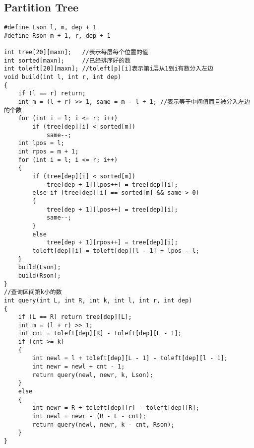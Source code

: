 \documentclass[twoside]{article}
\begin{document}
\subsection{Partition Tree}
\begin{lstlisting}
#define Lson l, m, dep + 1
#define Rson m + 1, r, dep + 1

int tree[20][maxn];   //表示每层每个位置的值
int sorted[maxn];     //已经排序好的数
int toleft[20][maxn]; //toleft[p][i]表示第i层从1到i有数分入左边
void build(int l, int r, int dep)
{
    if (l == r) return;
    int m = (l + r) >> 1, same = m - l + 1; //表示等于中间值而且被分入左边的个数
    for (int i = l; i <= r; i++)
        if (tree[dep][i] < sorted[m])
            same--;
    int lpos = l;
    int rpos = m + 1;
    for (int i = l; i <= r; i++)
    {
        if (tree[dep][i] < sorted[m])
            tree[dep + 1][lpos++] = tree[dep][i];
        else if (tree[dep][i] == sorted[m] && same > 0)
        {
            tree[dep + 1][lpos++] = tree[dep][i];
            same--;
        }
        else
            tree[dep + 1][rpos++] = tree[dep][i];
        toleft[dep][i] = toleft[dep][l - 1] + lpos - l;
    }
    build(Lson);
    build(Rson);
}
//查询区间第k小的数
int query(int L, int R, int k, int l, int r, int dep)
{
    if (L == R) return tree[dep][L];
    int m = (l + r) >> 1;
    int cnt = toleft[dep][R] - toleft[dep][L - 1];
    if (cnt >= k)
    {
        int newl = l + toleft[dep][L - 1] - toleft[dep][l - 1];
        int newr = newl + cnt - 1;
        return query(newl, newr, k, Lson);
    }
    else
    {
        int newr = R + toleft[dep][r] - toleft[dep][R];
        int newl = newr - (R - L - cnt);
        return query(newl, newr, k - cnt, Rson);
    }
}
\end{lstlisting}
\end{document}
